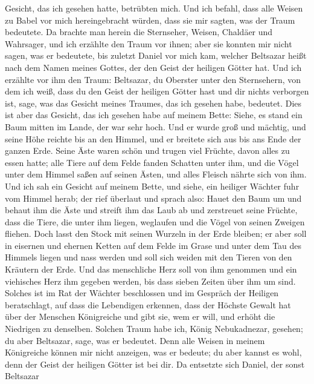 Gesicht, das ich gesehen hatte, betrübten mich.  Und ich
befahl, dass alle Weisen zu Babel vor mich hereingebracht würden, dass
sie mir sagten, was der Traum bedeutete.  Da brachte man
herein die Sternseher, Weisen, Chaldäer und Wahrsager, und ich erzählte
den Traum vor ihnen; aber sie konnten mir nicht sagen, was er bedeutete,
 bis zuletzt Daniel vor mich kam, welcher Beltsazar heißt
nach dem Namen meines Gottes, der den Geist der heiligen Götter hat. Und
ich erzählte vor ihm den Traum:  Beltsazar, du Oberster
unter den Sternsehern, von dem ich weiß, dass du den Geist der heiligen
Götter hast und dir nichts verborgen ist, sage, was das Gesicht meines
Traumes, das ich gesehen habe, bedeutet.  Dies ist aber das
Gesicht, das ich gesehen habe auf meinem Bette: Siehe, es stand ein Baum
mitten im Lande, der war sehr hoch.  Und er wurde groß und
mächtig, und seine Höhe reichte bis an den Himmel, und er breitete sich
aus bis ans Ende der ganzen Erde.  Seine Äste waren schön
und trugen viel Früchte, davon alles zu essen hatte; alle Tiere auf dem
Felde fanden Schatten unter ihm, und die Vögel unter dem Himmel saßen
auf seinen Ästen, und alles Fleisch nährte sich von ihm. 
Und ich sah ein Gesicht auf meinem Bette, und siehe, ein heiliger
Wächter fuhr vom Himmel herab;  der rief überlaut und
sprach also: Hauet den Baum um und behaut ihm die Äste und streift ihm
das Laub ab und zerstreuet seine Früchte, dass die Tiere, die unter ihm
liegen, weglaufen und die Vögel von seinen Zweigen fliehen.
 Doch lasst den Stock mit seinen Wurzeln in der Erde
bleiben; er aber soll in eisernen und ehernen Ketten auf dem Felde im
Grase und unter dem Tau des Himmels liegen und nass werden und soll sich
weiden mit den Tieren von den Kräutern der Erde.  Und das
menschliche Herz soll von ihm genommen und ein viehisches Herz ihm
gegeben werden, bis dass sieben Zeiten über ihm um sind. 
Solches ist im Rat der Wächter beschlossen und im Gespräch der Heiligen
beratschlagt, auf dass die Lebendigen erkennen, dass der Höchste Gewalt
hat über der Menschen Königreiche und gibt sie, wem er will, und erhöht
die Niedrigen zu denselben.  Solchen Traum habe ich, König
Nebukadnezar, gesehen; du aber Beltsazar, sage, was er bedeutet. Denn
alle Weisen in meinem Königreiche können mir nicht anzeigen, was er
bedeute; du aber kannst es wohl, denn der Geist der heiligen Götter ist
bei dir.  Da entsetzte sich Daniel, der sonst Beltsazar
